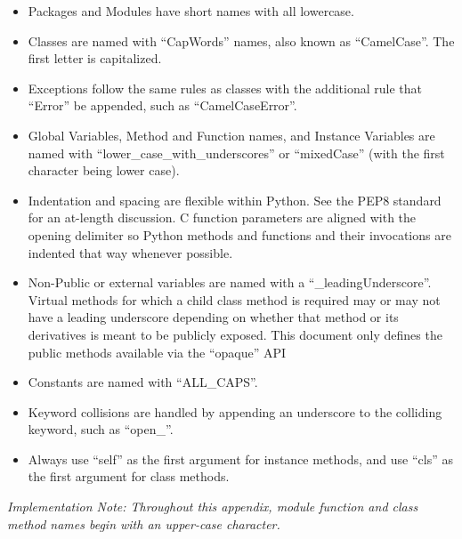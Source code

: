 \begin{itemize}[noitemsep,nolistsep]
\item{Packages and Modules have short names with all lowercase.}

\item{Classes are named with ``CapWords'' names, also known as
``CamelCase''. The first letter is capitalized.}

\item{Exceptions follow the same rules as classes with the additional
rule that ``Error'' be appended, such as ``CamelCaseError''.}

\item{Global Variables, Method and Function names, and Instance Variables
are named with ``lower_case_with_underscores'' or ``mixedCase'' (with the
first character being lower case).}

\item{Indentation and spacing are flexible within Python. See the PEP8 standard
for an at-length discussion. C function parameters are aligned with the opening
delimiter so Python methods and functions and their invocations are indented
that way whenever possible.}

\item{Non-Public or external variables are named with a
``_leadingUnderscore''. Virtual methods for which a child class method is
required may or may not have a leading underscore depending on whether that
method or its derivatives is meant to be publicly exposed. This document only
defines the public methods available via the ``opaque'' API}

\item{Constants are named with ``ALL_CAPS''.}

\item{Keyword collisions are handled by appending an underscore to the
colliding keyword, such as ``open_''.}

\item{Always use ``self'' as the first argument for instance methods, and use
``cls'' as the first argument for class methods.}

\end{itemize}

\emph{Implementation Note: Throughout this appendix, module function and class
method names begin with an upper-case character.}


